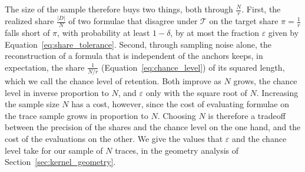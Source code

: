 \documentclass[titlepage,a4paper,11pt]{report}
\begin{document}
    The size of the sample therefore buys two things, both through $\frac{N}{r}$. First, the realized share $\frac{|D|}{N}$ of two formulae that disagree under $\mathcal T$ on the target share $\pi=\frac1r$ falls short of $\pi$, with probability at least $1-\delta$, by at most the fraction $\varepsilon$ given by Equation~\eqref{eq:share_tolerance}. Second, through sampling noise alone, the reconstruction of a formula that is independent of the anchors keeps, in expectation, the share $\frac{1}{N/r}$ (Equation~\eqref{eq:chance_level}) of its squared length, which we call the chance level of retention. Both improve as $N$ grows, the chance level in inverse proportion to $N$, and $\varepsilon$ only with the square root of $N$. Increasing the sample size $N$ has a cost, however, since the cost of evaluating formulae on the trace sample grows in proportion to $N$. Choosing $N$ is therefore a tradeoff between the precision of the shares and the chance level on the one hand, and the cost of the evaluations on the other. We give the values that $\varepsilon$ and the chance level take for our sample of $N$ traces, in the geometry analysis of Section~\ref{sec:kernel_geometry}.

    
\end{document}
